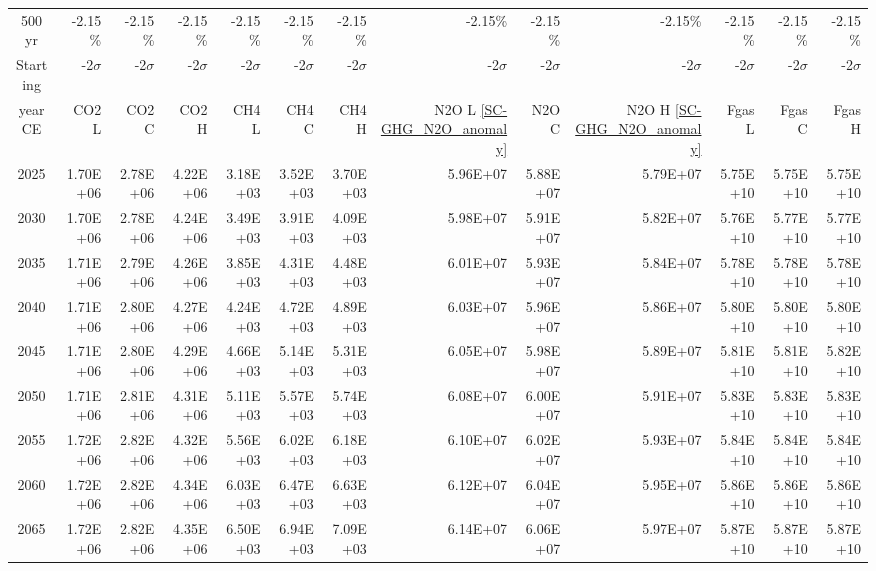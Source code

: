 \documentclass{article}
\begin{document}
\begin{table}
\begin{tabular}{crrr|rrr|rrr|rrr}
         &            &            &            &            &            &            &            &            &            &            &            &            \\ \hline
500 yr   & -2.15\%    & -2.15\%    & -2.15\%    & -2.15\%    & -2.15\%    & -2.15\%    & -2.15\%    & -2.15\%    & -2.15\%    & -2.15\%    & -2.15\%    & -2.15\%    \\
Starting & -2$\sigma$ & -2$\sigma$ & -2$\sigma$ & -2$\sigma$ & -2$\sigma$ & -2$\sigma$ & -2$\sigma$ & -2$\sigma$ & -2$\sigma$ & -2$\sigma$ & -2$\sigma$ & -2$\sigma$ \\
year CE  & CO2 L      & CO2 C      & CO2 H      & CH4 L      & CH4 C      & CH4 H      & N2O L \ref{SC-GHG_N2O_anomaly}     & N2O C      & N2O H \ref{SC-GHG_N2O_anomaly}      & Fgas L     & Fgas C     & Fgas H     \\
2025     & 1.70E+06   & 2.78E+06   & 4.22E+06   & 3.18E+03   & 3.52E+03   & 3.70E+03   & 5.96E+07   & 5.88E+07   & 5.79E+07   & 5.75E+10   & 5.75E+10   & 5.75E+10   \\
2030     & 1.70E+06   & 2.78E+06   & 4.24E+06   & 3.49E+03   & 3.91E+03   & 4.09E+03   & 5.98E+07   & 5.91E+07   & 5.82E+07   & 5.76E+10   & 5.77E+10   & 5.77E+10   \\
2035     & 1.71E+06   & 2.79E+06   & 4.26E+06   & 3.85E+03   & 4.31E+03   & 4.48E+03   & 6.01E+07   & 5.93E+07   & 5.84E+07   & 5.78E+10   & 5.78E+10   & 5.78E+10   \\
2040     & 1.71E+06   & 2.80E+06   & 4.27E+06   & 4.24E+03   & 4.72E+03   & 4.89E+03   & 6.03E+07   & 5.96E+07   & 5.86E+07   & 5.80E+10   & 5.80E+10   & 5.80E+10   \\
2045     & 1.71E+06   & 2.80E+06   & 4.29E+06   & 4.66E+03   & 5.14E+03   & 5.31E+03   & 6.05E+07   & 5.98E+07   & 5.89E+07   & 5.81E+10   & 5.81E+10   & 5.82E+10   \\
2050     & 1.71E+06   & 2.81E+06   & 4.31E+06   & 5.11E+03   & 5.57E+03   & 5.74E+03   & 6.08E+07   & 6.00E+07   & 5.91E+07   & 5.83E+10   & 5.83E+10   & 5.83E+10   \\
2055     & 1.72E+06   & 2.82E+06   & 4.32E+06   & 5.56E+03   & 6.02E+03   & 6.18E+03   & 6.10E+07   & 6.02E+07   & 5.93E+07   & 5.84E+10   & 5.84E+10   & 5.84E+10   \\
2060     & 1.72E+06   & 2.82E+06   & 4.34E+06   & 6.03E+03   & 6.47E+03   & 6.63E+03   & 6.12E+07   & 6.04E+07   & 5.95E+07   & 5.86E+10   & 5.86E+10   & 5.86E+10   \\
2065     & 1.72E+06   & 2.82E+06   & 4.35E+06   & 6.50E+03   & 6.94E+03   & 7.09E+03   & 6.14E+07   & 6.06E+07   & 5.97E+07   & 5.87E+10   & 5.87E+10   & 5.87E+10   \\

\end{tabular}
\end{table}
\end{document}

